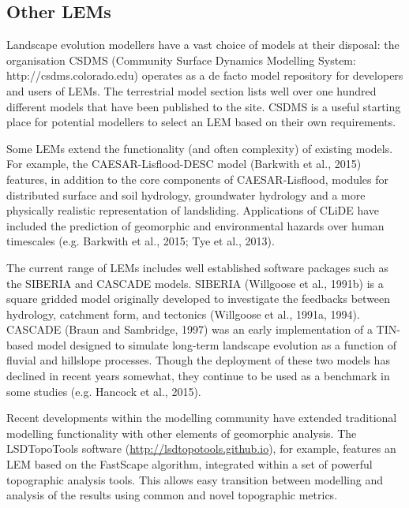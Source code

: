 \subsection{Other LEMs}

Landscape evolution modellers have a vast choice of models at their disposal: the organisation CSDMS (Community Surface Dynamics Modelling System:  http://csdms.colorado.edu) operates as a de facto model repository for developers and users of LEMs. The terrestrial model section lists well over one hundred different models that have been published to the site. CSDMS is a useful starting place for potential modellers to select an LEM based on their own requirements.  


Some LEMs extend the functionality (and often complexity) of existing models. For example, the CAESAR-Lisflood-DESC model (Barkwith et al., 2015) features, in addition to the core components of CAESAR-Lisflood, modules for distributed surface and soil hydrology, groundwater hydrology and a more physically realistic representation of landsliding. Applications of CLiDE have included the prediction of geomorphic and environmental hazards over human timescales (e.g. Barkwith et al., 2015; Tye et al., 2013). 

The current range of LEMs includes well established software packages such as the SIBERIA and CASCADE models. SIBERIA (Willgoose et al., 1991b) is a square gridded model originally developed to investigate the feedbacks between hydrology, catchment form, and tectonics (Willgoose et al., 1991a, 1994). CASCADE (Braun and Sambridge, 1997) was an early implementation of a TIN-based model designed to simulate long-term landscape evolution as a function of fluvial and hillslope processes.  Though the deployment of these two models has declined in recent years somewhat, they continue to be used as a benchmark in some studies (e.g. Hancock et al., 2015).

Recent developments within the modelling community have extended traditional modelling functionality with other elements of geomorphic analysis.  The LSDTopoTools software (\url{http://lsdtopotools.github.io}), for example, features an LEM based on the FastScape algorithm, integrated within a set of powerful topographic analysis tools. This allows easy transition between modelling and analysis of the results using common and novel topographic metrics. 

